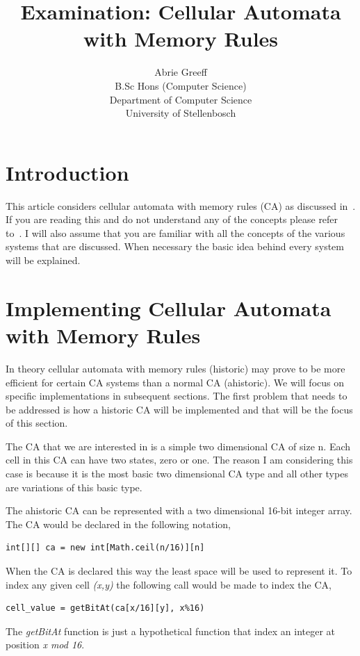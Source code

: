 \documentclass[a4paper,11pt,titlepage]{article}
\author{Abrie Greeff\\B.Sc Hons (Computer Science)\\Department of Computer Science\\University of Stellenbosch}
\title{Examination: Cellular Automata with Memory Rules}
\begin{document}
\maketitle
\tableofcontents
\section{Introduction}
This article considers cellular automata with memory rules (CA) as discussed in~\cite{art}. If you are reading this and do not understand any of the concepts please refer to~\cite{art}. I will also assume that you are familiar with all the concepts of the various systems that are discussed. When necessary the basic idea behind every system will be explained.

\section{Implementing Cellular Automata with Memory Rules}
In theory cellular automata with memory rules (historic) may prove to be more efficient for certain CA systems than a normal CA (ahistoric). We will focus on specific implementations in subsequent sections. The first problem that needs to be addressed is how a historic CA will be implemented and that will be the focus of this section.

The CA that we are interested in is a simple two dimensional CA of size n. Each cell in this CA can have two states, zero or one. The reason I am considering this case is because it is the most basic two dimensional CA type and all other types are variations of this basic type.

The ahistoric CA can be represented with a two dimensional 16-bit integer array. The CA would be declared in the following notation,
\begin{verbatim}
int[][] ca = new int[Math.ceil(n/16)][n]
\end{verbatim}
When the CA is declared this way the least space will be used to represent it. To index any given cell \emph{(x,y)} the following call would be made to index the CA,
\begin{verbatim}
cell_value = getBitAt(ca[x/16][y], x%16)
\end{verbatim} The \emph{getBitAt} function is just a hypothetical function that index an integer at position \emph{x mod 16}.
\end{document}
